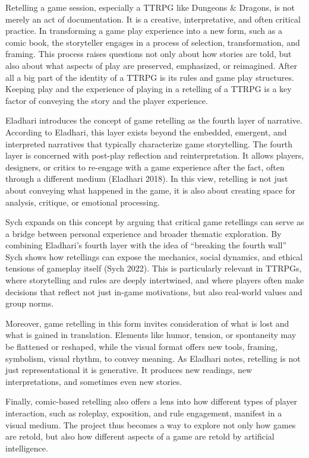 Retelling a game session, especially a TTRPG like Dungeons & Dragons, is not merely an act of documentation. It is a creative, interpretative, and often critical practice. In transforming a game  play experience into a new form, such as a comic book, the storyteller engages in a process of selection, transformation, and framing. This process raises questions not only about how stories are told, but also about what aspects of play are preserved, emphasized, or reimagined. After all a big part of the identity of a TTRPG is its rules and game play structures. Keeping play and the experience of playing in a retelling of a TTRPG is a key factor of conveying the story and the player experience.

Eladhari introduces the concept of game retelling as the fourth layer of narrative. According to Eladhari, this layer exists beyond the embedded, emergent, and interpreted narratives that typically characterize game storytelling. The fourth layer is concerned with post-play reflection and reinterpretation. It allows players, designers, or critics to re-engage with a game experience after the fact, often through a different medium (Eladhari 2018). In this view, retelling is not just about conveying what happened in the game, it is also about creating space for analysis, critique, or emotional processing.

Sych expands on this concept by arguing that critical game retellings can serve as a bridge between personal experience and broader thematic exploration. By combining Eladhari’s fourth layer with the idea of “breaking the fourth wall” Sych shows how retellings can expose the mechanics, social dynamics, and ethical tensions of gameplay itself (Sych 2022). This is particularly relevant in TTRPGs, where storytelling and rules are deeply intertwined, and where players often make decisions that reflect not just in-game motivations, but also real-world values and group norms.

Moreover, game retelling in this form invites consideration of what is lost and what is gained in translation. Elements like humor, tension, or spontaneity may be flattened or reshaped, while the visual format offers new tools, framing, symbolism, visual rhythm, to convey meaning. As Eladhari notes, retelling is not just representational it is generative. It produces new readings, new interpretations, and sometimes even new stories.

Finally, comic-based retelling also offers a lens into how different types of player interaction, such as roleplay, exposition, and rule engagement, manifest in a visual medium. The project thus becomes a way to explore not only how games are retold, but also how different aspects of a game are retold by artificial intelligence.


